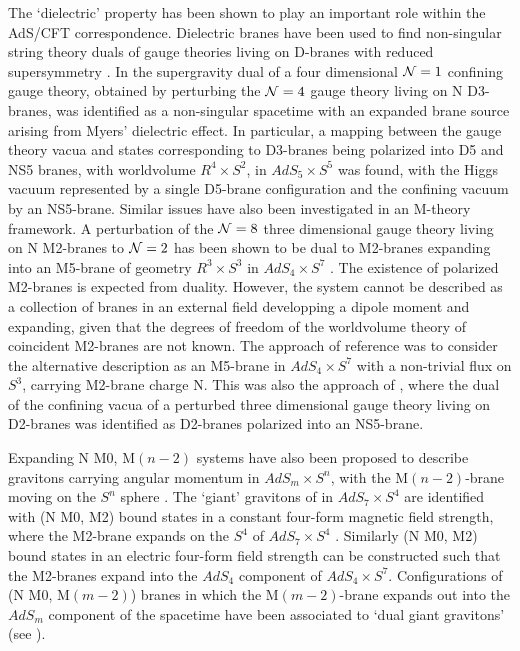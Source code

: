 \documentclass[12pt,a4paper]{article}
\begin{document}
The `dielectric' property has been shown to play an important role 
within the AdS/CFT correspondence. Dielectric branes have been used
to find non-singular string theory duals of gauge theories living on
D-branes with reduced supersymmetry \cite{PS,AR,Bena}.
In \cite{PS} the supergravity dual of a four dimensional 
${\cal N}=1$ confining gauge theory, obtained by perturbing the
${\cal N}=4$ gauge theory living on N D3-branes, was identified
as a non-singular spacetime with an expanded brane source 
arising from Myers' 
dielectric effect. In particular, a mapping between the
gauge theory vacua and states corresponding to D3-branes being
polarized into D5 and NS5 branes, with worldvolume $R^4\times S^2$,
in $AdS_5\times S^5$ was found, with the Higgs vacuum
represented by a single D5-brane configuration and the confining
vacuum by an NS5-brane.
Similar issues have also been investigated in an M-theory 
framework. A perturbation of the ${\cal N}=8$ three dimensional 
gauge theory living on N M2-branes to ${\cal N}=2$
has been shown to be dual to
M2-branes expanding into an M5-brane of geometry $R^3\times S^3$
in $AdS_4\times S^7$ \cite{Bena2}.
The existence of polarized M2-branes is expected from duality. 
However, the system cannot be described as a collection of branes 
in an external field developping a dipole moment and expanding,
given that the degrees of freedom of the worldvolume theory of
coincident M2-branes are not
known. The approach of reference \cite{Bena2} was to consider the 
alternative description as an 
M5-brane in $AdS_4\times S^7$
with a non-trivial flux on $S^3$, carrying 
M2-brane charge N. This was also the approach of \cite{Bena}, where
the dual of the confining vacua of a perturbed three dimensional
gauge theory living on D2-branes was identified as
D2-branes polarized into an NS5-brane. 

Expanding N M0, M$(n-2)$ systems have also been proposed to describe 
gravitons carrying angular momentum in $AdS_m\times S^n$,
with the M$(n-2)$-brane moving on the $S^n$ sphere \cite{GST}. 
The `giant' gravitons of \cite{GST} in $AdS_7 \times S^4$ are 
identified with (N M0, M2)
bound states in a constant four-form magnetic field strength,
where the M2-brane expands on the $S^4$ of $AdS_7\times S^4$
\cite{DTV}. Similarly (N M0, M2) bound states in an electric four-form
field strength can be constructed such that the M2-branes expand into 
the $AdS_4$
component of $AdS_4\times S^7$. Configurations of (N M0, M$(m-2)$) branes
in which the M$(m-2)$-brane expands out into
the $AdS_m$ component of the spacetime have been associated to
`dual giant gravitons' (see \cite{GMT}).
\end{document}
